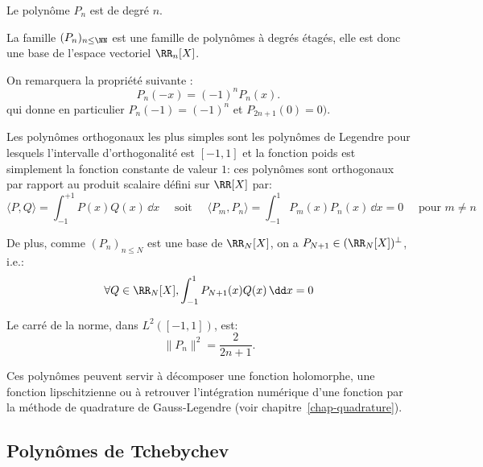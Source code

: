 \medskip
Le polynôme $P_n$ est de degré $n$.

La famille $(P_n)_{n\leq \NN}$ est une famille de polynômes à degrés étagés, 
elle est donc une base de l'espace vectoriel $\RR_n[X]$.

\medskip
On remarquera la propriété suivante :
\begin{equation}
    P_n(-x)=(-1)^nP_n(x).\,
\end{equation}
qui donne en particulier $P_n( - 1) = ( - 1)^n$ et $P_{2n + 1}(0) = 0)$.

\medskip
Les polynômes orthogonaux les plus simples sont les polynômes de Legendre 
pour lesquels  l'intervalle d'orthogonalité est $[-1, 1]$ et la fonction poids est simplement la fonction 
constante de valeur $1$: 
ces polynômes sont orthogonaux par rapport au produit scalaire défini sur $\RR[X]$ par:
\begin{equation}
    \langle P,Q\rangle= \int_{-1}^{+1} P(x) Q(x)\, \dd x
   \quad \text{ soit } \quad 
    \langle P_m,P_n\rangle= \int_{-1}^{1} P_m(x)P_n(x)\,\dd x = 0\quad \text{ pour } m \ne n 
\end{equation}

\medskip
De plus, comme $(P_n)_{n\leq N}$ est une base de $\RR_N[X]$, 
on a $P_{N+1} \in (\RR_N[X])^\bot$, i.e.:
\begin{equation}
    \forall Q \in \RR_N[X], \int_{-1}^{1} P_{N+1}(x)Q(x)\,\dd x = 0
\end{equation}

\medskip
Le carré de la norme, dans $L^2([-1,1])$, est:
\begin{equation}
    \|P_n\|^2=\frac{2}{2n+1}. 
\end{equation}


\medskip
Ces polynômes peuvent servir à décomposer une fonction holomorphe,
une fonction lipschitzienne ou à retrouver l'intégration numérique d'une fonction par
la méthode de quadrature de Gauss-Legendre (voir chapitre~\ref{chap-quadrature}).




\medskip
\subsection{Polynômes de Tchebychev}

